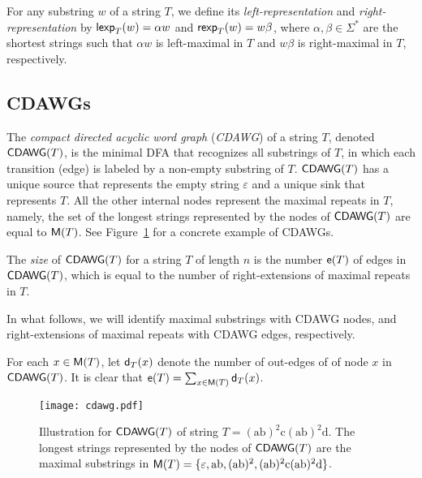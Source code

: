 
For any substring $w$ of a string $T$,
we define its \emph{left-representation} and \emph{right-representation}
by $\mathsf{lexp}_T(w) = \alpha w$ and $\mathsf{rexp}_T(w) = w \beta$,
where $\alpha, \beta \in \Sigma^*$ are the shortest strings
such that $\alpha w$ is left-maximal in $T$
and $w\beta$ is right-maximal in $T$, respectively.

\subsection{CDAWGs}

The \emph{compact directed acyclic word graph} (\emph{CDAWG}) of a string $T$,
denoted $\mathsf{CDAWG}(T)$,
is the minimal DFA that recognizes all substrings of $T$,
in which each transition (edge) is labeled by a non-empty substring of $T$.
$\mathsf{CDAWG}(T)$ has a unique source that represents the empty string $\varepsilon$
and a unique sink that represents $T$.
All the other internal nodes represent the maximal repeats in $T$,
namely, the set of the longest strings represented by the nodes of $\mathsf{CDAWG}(T)$ are equal to $\mathsf{M}(T)$.
See Figure~\ref{fig:cdawg} for a concrete example of CDAWGs.

The \emph{size} of $\mathsf{CDAWG}(T)$ for a string $T$ of length $n$
is the number $\mathsf{e}(T)$ of edges in $\mathsf{CDAWG}(T)$,
which is equal to the number of right-extensions of maximal repeats in $T$.

In what follows, we will identify
maximal substrings with CDAWG nodes,
and right-extensions of maximal repeats with CDAWG edges,
respectively.

For each $x \in \mathsf{M}(T)$,
let $\mathsf{d}_T(x)$ denote the number of out-edges of of node $x$ in $\mathsf{CDAWG}(T)$.
It is clear that $\mathsf{e}(T) = \sum_{x \in \mathsf{M}(T)} \mathsf{d}_T(x)$.

\begin{figure}[tbh]
  \centering
  \texttt{[image: cdawg.pdf]}
  \caption{Illustration for $\mathsf{CDAWG}(T)$ of string $T=\mathrm{(ab)^2 c(ab)^2d}$. The longest strings represented by the nodes of $\mathsf{CDAWG}(T)$ are the maximal substrings in $\mathsf{M}(T) = \{\mathrm{\varepsilon, ab, (ab)^2, (ab)^2 c(ab)^2d}\}$.}
  \label{fig:cdawg}
\end{figure}

